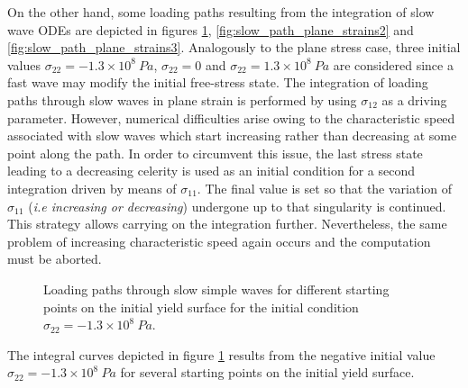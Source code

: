On the other hand, some loading paths resulting from the integration of slow wave ODEs are depicted in figures \ref{fig:slow_path_plane_strains1}, \ref{fig:slow_path_plane_strains2} and \ref{fig:slow_path_plane_strains3}.
Analogously to the plane stress case, three initial values $\sigma_{22}=-1.3 \times 10^{8} \: Pa$, $\sigma_{22}=0$ and $\sigma_{22}=1.3 \times 10^8 \: Pa$ are considered since a fast wave may modify the initial free-stress state.
The integration of loading paths through slow waves in plane strain is performed by using $\sigma_{12}$ as a driving parameter.
However, numerical difficulties arise owing to the characteristic speed associated with slow waves which start increasing rather than decreasing at some point along the path.
In order to circumvent this issue, the last stress state leading to a decreasing celerity is used as an initial condition for a second integration driven by means of $\sigma_{11}$.
The final value is set so that the variation of $\sigma_{11}$ (\textit{i.e increasing or decreasing}) undergone up to that singularity is continued.
This strategy allows carrying on the integration further.
Nevertheless, the same problem of increasing characteristic speed again occurs and the computation must be aborted.
\begin{figure}[h!]
  \centering
  \caption{Loading paths through slow simple waves for different starting points on the initial yield surface for the initial condition $\sigma_{22}=-1.3 \times 10^{8} \: Pa$.}
  \label{fig:slow_path_plane_strains1}
\end{figure}
The integral curves depicted in figure \ref{fig:slow_path_plane_strains1} results from the negative initial value $\sigma_{22}=-1.3 \times 10^{8} \: Pa$ for several starting points on the initial yield surface.

